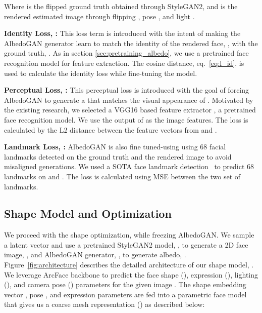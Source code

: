 \documentclass[10pt,twocolumn,letterpaper]{article}
\begin{document}
\label{eq:l_rec}

\vspace{-2mm}

Where  is the flipped ground truth obtained through StyleGAN2, and  is the rendered estimated image through flipping , pose , and light . 

{\bf Identity Loss, :} This loss term is introduced with the intent of making the AlbedoGAN generator learn to match the identity of the rendered face, , with the ground truth, . As in section \ref{sec:pretraining_albedo}, we use a pretrained face recognition model \cite{he2016deep} for feature extraction. The cosine distance, eq.~\ref{eq:l_id}, is used to calculate the identity loss while fine-tuning the model.


{\bf Perceptual Loss, :} This perceptual loss is introduced with the goal of  forcing AlbedoGAN to generate a  that matches the visual appearance of . Motivated by the existing research, we selected a VGG16 based feature extractor \cite{schroff2015facenet}, a pretrained face recognition model. We use the output of  as the image features. The loss is calculated by the L2 distance between the feature vectors from  and .  



{\bf Landmark Loss, :} AlbedoGAN is also fine tuned-using using 68 facial landmarks detected on the ground truth and the rendered image to avoid misaligned generations. We used a SOTA face landmark detection~\cite{yin2020fan} to predict 68 landmarks on  and . The loss is calculated using MSE between the two set of landmarks. 




\subsection{Shape Model and Optimization}
\label{sec:shape_optimization}
We proceed with the shape optimization, while freezing AlbedoGAN. We sample a latent vector  and use a pretrained StyleGAN2 model, , to generate a 2D face image, , and AlbedoGAN generator, , to generate albedo, . Figure~\ref{fig:architecture} describes the detailed architecture of our shape model, . We leverage ArcFace backbone \cite{deng2019arcface} to predict the face shape (), expression (), lighting (), and camera pose () parameters for the given image . 
The shape  embedding vector , pose , and expression  parameters are fed into a parametric face model that gives us a coarse mesh representation () as described below: 
\end{document}
